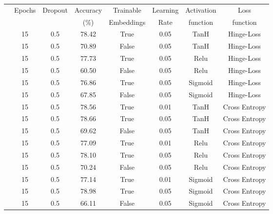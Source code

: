 \documentclass[a0,landscape]{a0poster}
\begin{document}
\begin{multicols}{3}
\begin{center}
\begin{tabular}{c | c |c | c | c | c | c | c }
		& Epochs & Dropout & Accuracy & Trainable & Learning & Activation & Loss \\
		& & &  (\%) & Embeddings & Rate & function & function\\
		\hline
		\hline
		{\multirow{15}{*}{\centering \rotatebox[origin=c]{90}{Lexical}}} & 15 & 0.5 & 78.42 & True & 0.05 & TanH & Hinge-Loss\\
		& 15 & 0.5 & 70.89 & False & 0.05 & TanH & Hinge-Loss\\
		& 15 & 0.5 & 77.73 & True & 0.05 & Relu & Hinge-Loss\\
		& 15 & 0.5 & 60.50 & False & 0.05 & Relu & Hinge-Loss\\
		& 15 & 0.5 & 76.86 & True & 0.05 & Sigmoid & Hinge-Loss\\
		& 15 & 0.5 & 67.85 & False & 0.05 & Sigmoid & Hinge-Loss\\
		& 15 & 0.5 & 78.56 & True & 0.01 & TanH & Cross Entropy\\
		& \cellcolor{lightblue}15 & \cellcolor{lightblue}0.5 & \cellcolor{lightblue}78.66 & \cellcolor{lightblue}True & \cellcolor{lightblue}0.05 & \cellcolor{lightblue}TanH & \cellcolor{lightblue}Cross Entropy\\
		& 15 & 0.5 & 69.62 & False & 0.05 & TanH & Cross Entropy\\
		& 15 & 0.5 & 77.09 & True & 0.01 & Relu & Cross Entropy\\
		& \cellcolor{lightblue}15 & \cellcolor{lightblue}0.5 & \cellcolor{lightblue}78.10 & \cellcolor{lightblue}True & \cellcolor{lightblue}0.05 & \cellcolor{lightblue}Relu & \cellcolor{lightblue}Cross Entropy\\
		& 15 & 0.5 & 70.24 & False & 0.05 & Relu & Cross Entropy\\
		& 15 & 0.5 & 77.14 & True & 0.01 & Sigmoid & Cross Entropy\\
		& \cellcolor{lightblue}15 & \cellcolor{lightblue}0.5 & \cellcolor{lightblue}78.98 & \cellcolor{lightblue}True & \cellcolor{lightblue}0.05 & \cellcolor{lightblue}Sigmoid & \cellcolor{lightblue}Cross Entropy\\
		& 15 & 0.5 & 66.11 & False & 0.05 & Sigmoid & Cross Entropy\\
			

\end{tabular}
\end{center}
\end{multicols}
\end{document}
